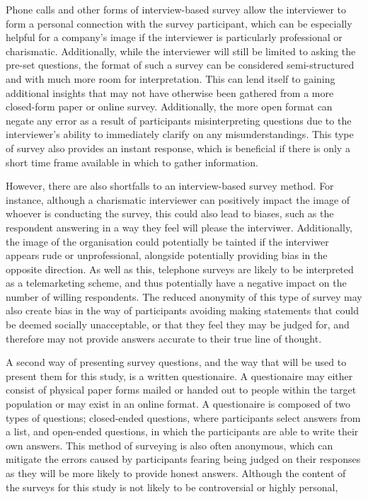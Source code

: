 Phone calls and other forms of interview-based survey allow the interviewer to form a personal connection with 
the survey participant, which can be especially helpful for a company's image if the interviewer is particularly professional 
or charismatic. Additionally, while the interviewer will still be limited to asking the pre-set questions, the format of such a survey can 
be considered semi-structured and with much more room for interpretation. This can lend itself to gaining additional insights
that may not have otherwise been gathered from a more closed-form paper or online survey. Additionally, the more open format
can negate any error as a result of participants misinterpreting questions due to the interviewer's ability to immediately 
clarify on any misunderstandings. This type of survey also provides an instant response, which is beneficial if there is only 
a short time frame available in which to gather information. 

However, there are also shortfalls to an interview-based survey method. For instance, although a charismatic interviewer can 
positively impact the image of whoever is conducting the survey, this could also lead to biases, such as the respondent 
answering in a way they feel will please the interviwer.
Additionally, the image of the organisation could potentially be tainted if the interviwer appears rude or unprofessional, 
alongside potentially providing bias in the opposite direction. As well as this, telephone surveys are likely to be 
interpreted as a telemarketing scheme, and thus potentially have a negative impact on the number of willing respondents.
The reduced anonymity of this type of survey may also create bias in the way of participants avoiding making statements
that could be deemed socially unacceptable, or that they feel they may be judged for, and therefore may not provide answers
accurate to their true line of thought.

A second way of presenting survey questions, and the way that will be used to present them for this study, is a written questionaire.
A questionaire may either consist of physical paper forms mailed or handed out to people within the target population or may
exist in an online format. A questionaire is composed of two types of questions; closed-ended questions, where participants 
select answers from a list, and open-ended questions, in which the participants are able to write their own answers. This method of surveying
is also often anonymous, which can mitigate the errors caused by participants fearing being judged on their responses as they will be more likely
to provide honest answers. Although the content of the surveys for this study is not likely to be controversial or highly personal, 

